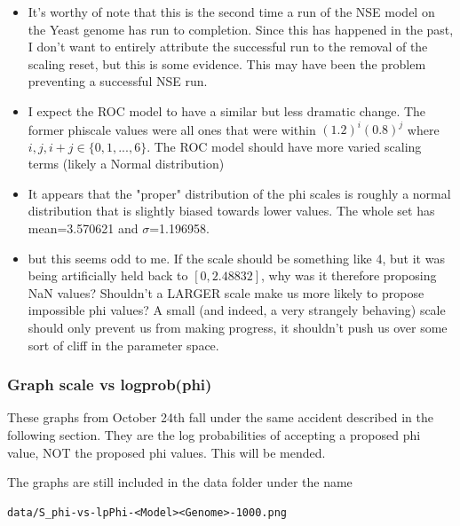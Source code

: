 \begin{itemize}
\item It's worthy of note that this is the second time a run of the NSE model on the Yeast genome has run to completion. Since this has happened in the past, I don't want to entirely attribute the successful run to the removal of the scaling reset, but this is some evidence. This may have been the problem preventing a successful NSE run.

\item I expect the ROC model to have a similar but less dramatic change. The former phiscale values were all ones that were within $(1.2)^i(0.8)^j$ where $i, j, i+j \in \{0, 1,...,6\}$. The ROC model should have more varied scaling terms (likely a Normal distribution)

\item It appears that the "proper" distribution of the phi scales is roughly a normal distribution that is slightly biased towards lower values. The whole set has mean=3.570621 and $\sigma$=1.196958.


\item but this seems odd to me. If the scale should be something like 4, but it was being artificially held back to $[0,2.48832]$, why was it therefore proposing NaN values? Shouldn't a LARGER scale make us more likely to propose impossible phi values? A small (and indeed, a very strangely behaving) scale should only prevent us from making progress, it shouldn't push us over some sort of cliff in the parameter space.
\end{itemize}


\subsubsection{Graph scale vs logprob(phi)}

These graphs from October 24th fall under the same accident described in the following section. They are the log probabilities of accepting a proposed phi value, NOT the proposed phi values.
This will be mended.

The graphs are still included in the data folder under the name 
\begin{verbatim}
data/S_phi-vs-lpPhi-<Model><Genome>-1000.png
\end{verbatim}





